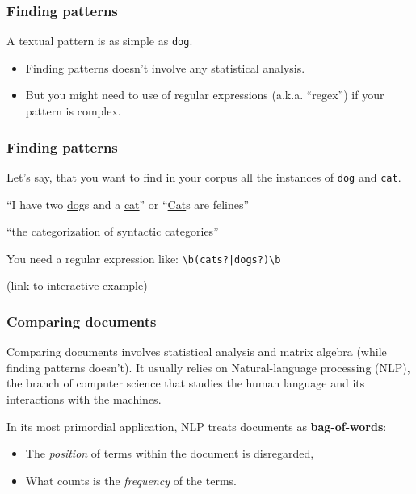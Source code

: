 \documentclass[serif, aspectratio=169]{beamer}
\begin{document}
\begin{frame}[fragile]
\frametitle{Finding patterns}

A textual pattern is as simple as \texttt{dog}.

\begin{itemize}

\item Finding patterns doesn't involve any statistical analysis.

\item But you might need to use of regular expressions (a.k.a. \enquote{regex}) if your pattern is complex.

\end{itemize}

\end{frame}

\begin{frame}[fragile]
\frametitle{Finding patterns}

Let's say, that you want to find in your corpus all the instances of \texttt{dog} and \texttt{cat}.

\begin{description}

\item<1->[You want to find] \enquote{I have two \underline{dog}s and a \underline{cat}} or \enquote{\underline{Cat}s are felines}

\item<2->[But you don't want to find]  \enquote{the \underline{cat}egorization of syntactic \underline{cat}egories}

\item<3-> You need a regular expression like: {\LARGE\verb=\b(cats?|dogs?)\b=} 

\end{description}

{\tiny (\href{https://regexr.com/3oqld}{link to interactive example})}

\end{frame}

\begin{frame}
\frametitle{Comparing documents}

Comparing documents involves statistical analysis and matrix algebra (while finding patterns doesn't). It usually relies on Natural-language processing (NLP), the branch of computer science that studies the human language and its interactions with the machines. 

In its most primordial application, NLP treats documents as \textbf{bag-of-words}:
\begin{itemize}
\item  The \textit{position} of terms within the document is disregarded,
\item What counts is the \textit{frequency} of the terms.
\end{itemize}

\end{frame}
\end{document}
